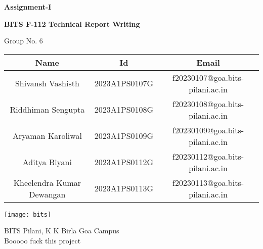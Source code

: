 \begin{titlepage}

	\begin{center}

		\vspace*{1cm}
		\Huge
		\textbf{Assignment-I}

		\vspace{0.5cm}

		\LARGE
		\textbf{BITS F-112 Technical Report Writing}

		\vspace{0.8cm}

		\Large	
		Group No. 6

		\vspace{0.6cm}

		\normalsize
		\begingroup
		\setlength{\tabcolsep}{10pt}
		\renewcommand{\arraystretch}{1.8}
		\begin{tabular} { || c | c | c || }
			\hline
			Name & Id & Email \\ [0.5ex]
			\hline \hline

			\hline  
			Shivansh Vashisth & 2023A1PS0107G & f20230107@goa.bits-pilani.ac.in \\  
			Riddhiman Sengupta & 2023A1PS0108G & f20230108@goa.bits-pilani.ac.in \\
			Aryaman Karoliwal & 2023A1PS0109G & f20230109@goa.bits-pilani.ac.in \\
			Aditya Biyani & 2023A1PS0112G & f20230112@goa.bits-pilani.ac.in \\
			Kheelendra Kumar Dewangan & 2023A1PS0113G & f20230113@goa.bits-pilani.ac.in \\
			[1ex]
			\hline
		\end{tabular}
		\endgroup
		

		\vfill

		\texttt{[image: bits]}

		\Large
		BITS Pilani, K K Birla Goa Campus \\ 
		Booooo fuck this project
	\end{center}

\end{titlepage}


